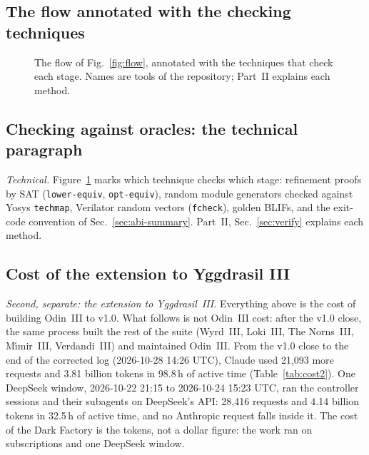 \documentclass[conference]{IEEEtran}
\newcommand{\code}[1]{\texttt{#1}}
\begin{document}
\subsection{The flow annotated with the checking techniques}

\begin{figure}[t]
\centering
\odinfit{\textwidth}{}
\caption{The flow of Fig.~\ref{fig:flow}, annotated with the techniques that check each stage. Names are tools of the repository; Part~II explains each method.}
\label{fig:flow-verify}
\end{figure}

\subsection{Checking against oracles: the technical paragraph}

\emph{Technical.} Figure~\ref{fig:flow-verify} marks which technique checks which stage: refinement proofs by SAT (\code{lower-equiv}, \code{opt-equiv}), random module generators checked against Yosys \code{techmap}, Verilator random vectors (\code{fcheck}), golden BLIFs, and the exit-code convention of Sec.~\ref{sec:abi-summary}. Part~II, Sec.~\ref{sec:verify} explains each method.

\subsection{Cost of the extension to Yggdrasil III}

\emph{Second, separate: the extension to Yggdrasil~III.} Everything above is the cost of building Odin~III to v1.0. What follows is not Odin~III cost: after the v1.0 close, the same process built the rest of the suite (Wyrd~III, Loki~III, The Norns~III, M\'{\i}mir~III, Verdandi~III) and maintained Odin~III. From the v1.0 close to the end of the corrected log (2026-10-28 14:26 UTC), Claude used 21,093 more requests and 3.81 billion tokens in 98.8\,h of active time (Table~\ref{tab:cost2}). One DeepSeek window, 2026-10-22 21:15 to 2026-10-24 15:23 UTC, ran the controller sessions and their subagents on DeepSeek's API: 28,416 requests and 4.14 billion tokens in 32.5\,h of active time, and no Anthropic request falls inside it. The cost of the Dark Factory is the tokens, not a dollar figure: the work ran on subscriptions and one DeepSeek window.
\end{document}
